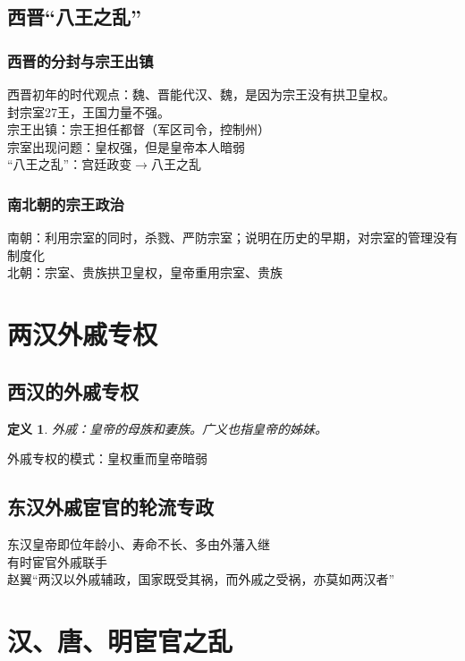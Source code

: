 \documentclass[twoside]{article}
\newtheorem{definition}[theorem]{定义}
\begin{document}
\subsection{西晋``八王之乱''}
\subsubsection{西晋的分封与宗王出镇}
西晋初年的时代观点：魏、晋能代汉、魏，是因为宗王没有拱卫皇权。\\
封宗室27王，王国力量不强。\\
宗王出镇：宗王担任都督（军区司令，控制州）\\
宗室出现问题：皇权强，但是皇帝本人暗弱\\
``八王之乱''：宫廷政变$\rightarrow$八王之乱
\subsubsection{南北朝的宗王政治}
南朝：利用宗室的同时，杀戮、严防宗室；说明在历史的早期，对宗室的管理没有制度化\\
北朝：宗室、贵族拱卫皇权，皇帝重用宗室、贵族

\section{两汉外戚专权}
\subsection{西汉的外戚专权}
\begin{definition}
  外戚：皇帝的母族和妻族。广义也指皇帝的姊妹。
\end{definition}
外戚专权的模式：皇权重而皇帝暗弱
\subsection{东汉外戚宦官的轮流专政}
东汉皇帝即位年龄小、寿命不长、多由外藩入继\\
有时宦官外戚联手\\
赵翼``两汉以外戚辅政，国家既受其祸，而外戚之受祸，亦莫如两汉者''

\section{汉、唐、明宦官之乱}
\end{document}
